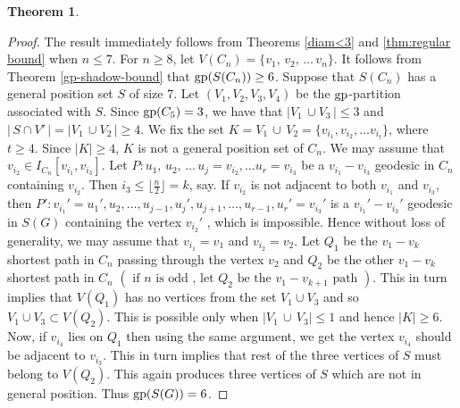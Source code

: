 \documentclass[a4paper,12pt]{article}
\newtheorem{theorem}{Theorem}[section]
\newcommand{\gp}{{\rm gp}}
\begin{document}
{\begin{theorem}
\end{theorem}
\begin{proof}
The result immediately follows from Theorems \ref{diam<3} and \ref{thm:regular bound} when $n\leq 7$. 
 For $n \geq 8$, let $V(C_n)=\{ v_1,\,v_2,\, \dots \,v_n\}$. It follows from Theorem \ref{gp-shadow-bound} that $\gp(S(C_n)) \geq 6$. Suppose that $S(C_n)$ has a general position set $S$ of size $7$. Let $(V_1,V_2,V_3,V_4)$ be the  $\gp$-partition associated with $S$. Since $\gp(C_5)=3$, we have that $\lvert V_1 \,\cup V_3 \,\rvert \leq 3$ and $ \lvert \,S \cap V'\, \rvert= \lvert V_1 \,\cup V_2\, \rvert \geq 4 $. We fix the set $K= V_1 \,\cup \,V_2 = \{v_{i_{1}}, v_{i_{2}}, \dots v_{i_{t}} \}$, where $t \geq 4$. Since $\lvert K \rvert \geq 4$,   $K$ is not a general position set of $C_n$. We may assume that $v_{i_{2}} \in I_{C_n}[ v_{i_{1}}, v_{i_{3}}]$. Let $P : u_1,\,u_2,\, \dots \,u_j=v_{i_{2}}, \dots u_r=v_{i_{3}}$ be a $v_{i_{1}}-v_{i_{3}}$ geodesic  in $C_n$ containing $v_{i_{2}}$. Then $i_{3} \leq \lfloor \frac{n}{2} \rfloor = k$, say. If $v_{i_{2}}$ is not adjacent to both $v_{i_{1}}$ and $v_{i_{3}}$, then $P': v_{i_{1}}'= u_1', u_2, \dots  ,u_{j-1}, u_{j}', u_{j+1}, \dots ,u_{r-1}, u_{r}'=v_{i_{3}}'$ is a $v_{i_{1}}'-v_{i_{3}}'$ geodesic in $S(G)$ containing the vertex $v_{i_{2}}'$ , which is impossible. Hence without loss of generality, we may assume that $v_{i_{1}}= v_1$ and $v_{i_{2}} =v_2$. Let $Q_1$ be the $v_1 - v_k$ shortest path in $C_n$ passing through the vertex $v_2$ and $Q_2$ be the other $v_1 - v_k$  shortest path in $C_n$ $( \text{ if } n \text{ is odd , let } Q_2 \text{ be the } v_1 - v_{k + 1} \text{ path })$. This in turn implies that $V(Q_1)$ has no vertices from the set $V_1 \cup V_3$ and so $V_1 \cup V_3 \subset V(Q_2)$. This is possible only when $ \lvert V_1\, \cup\, V_3 \rvert \leq 1$ and hence $\lvert K \rvert \geq 6$. Now, if $v_{i_{4}}$ lies on $Q_1$ then using the same argument, we get the vertex $v_{i_{4}}$ should be adjacent to $v_{i_{3}}$. This in turn implies that rest of the three vertices of $S$ must belong to $V(Q_2)$. This again produces three vertices of $S$ which are not in general position. Thus $\gp(S(G))=6$.
\end{proof}

}
\end{document}
